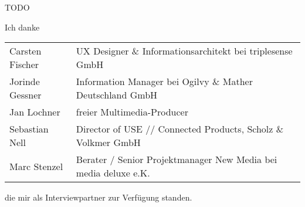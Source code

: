 \documentclass[11pt,a4paper]{article}
\begin{document}
TODO

Ich danke 

\begin{tabular}{@{}l l}
Carsten Fischer & UX Designer \& Informationsarchitekt bei triplesense GmbH\\
Jorinde Gessner & Information Manager bei Ogilvy \& Mather Deutschland GmbH\\
Jan Lochner & freier Multimedia-Producer\\
Sebastian Nell & Director of USE // Connected Products, Scholz \& Volkmer GmbH\\
Marc Stenzel & Berater / Senior Projektmanager New Media bei media deluxe e.K.
\end{tabular}

die mir als Interviewpartner zur Verfügung standen.

\pagebreak



\pagebreak

\tableofcontents

\pagebreak









\pagebreak


\end{document}
